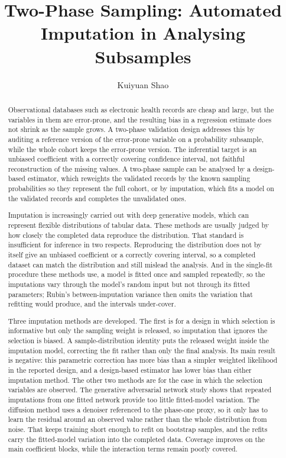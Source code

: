 \documentclass[a4paper,12pt,numbered,print]{uathesis}
\title{Two-Phase Sampling: Automated Imputation in Analysing Subsamples}
\author{Kuiyuan Shao}
\numberwithin{equation}{section}
\begin{document}
\maketitle

\frontmatter
\begin{abstract}
Observational databases such as electronic health records are cheap and large, but the variables in them are error-prone, and the resulting bias in a regression estimate does not shrink as the sample grows. A two-phase validation design addresses this by auditing a reference version of the error-prone variable on a probability subsample, while the whole cohort keeps the error-prone version. The inferential target is an unbiased coefficient with a correctly covering confidence interval, not faithful reconstruction of the missing values. A two-phase sample can be analysed by a design-based estimator, which reweights the validated records by the known sampling probabilities so they represent the full cohort, or by imputation, which fits a model on the validated records and completes the unvalidated ones.

Imputation is increasingly carried out with deep generative models, which can represent flexible distributions of tabular data. These methods are usually judged by how closely the completed data reproduce the distribution. That standard is insufficient for inference in two respects. Reproducing the distribution does not by itself give an unbiased coefficient or a correctly covering interval, so a completed dataset can match the distribution and still mislead the analysis. And in the single-fit procedure these methods use, a model is fitted once and sampled repeatedly, so the imputations vary through the model's random input but not through its fitted parameters; Rubin's between-imputation variance then omits the variation that refitting would produce, and the intervals under-cover.

Three imputation methods are developed. The first is for a design in which selection is informative but only the sampling weight is released, so imputation that ignores the selection is biased. A sample-distribution identity puts the released weight inside the imputation model, correcting the fit rather than only the final analysis. Its main result is negative: this parametric correction has more bias than a simpler weighted likelihood in the reported design, and a design-based estimator has lower bias than either imputation method. The other two methods are for the case in which the selection variables are observed. The generative adversarial network study shows that repeated imputations from one fitted network provide too little fitted-model variation. The diffusion method uses a denoiser referenced to the phase-one proxy, so it only has to learn the residual around an observed value rather than the whole distribution from noise. That keeps training short enough to refit on bootstrap samples, and the refits carry the fitted-model variation into the completed data. Coverage improves on the main coefficient blocks, while the interaction terms remain poorly covered.


\end{abstract}
\end{document}
